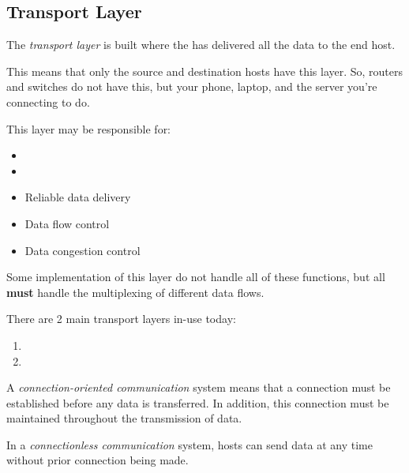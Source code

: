 \subsection{Transport Layer}\label{subsec:Transport_Layer}
\begin{definition}\label{def:Transport_Layer}
  The \emph{transport layer} is built where the  has delivered all the data to the end host.

  This means that only the source and destination hosts have this layer.
  So, routers and switches do not have this, but your phone, laptop, and the server you're connecting to do.
  
  This layer may be responsible for:
  \begin{itemize}[noitemsep]
  \item {}
  \item {}
  \item Reliable data delivery
  \item Data flow control
  \item Data congestion control
  \end{itemize}
  Some implementation of this layer do not handle all of these functions, but all \textbf{must} handle the multiplexing of different data flows.

  There are 2 main transport layers in-use today:
  \begin{enumerate}[noitemsep]
  \item {}
  \item {}
  \end{enumerate}
\end{definition}

\begin{definition}\label{def:Connection_Oriented_Communication}
  A \emph{connection-oriented communication} system means that a connection must be established before any data is transferred.
  In addition, this connection must be maintained throughout the transmission of data.

  \begin{remark}\label{rmk:Connectionless_Communication}
    In a \emph{connectionless communication} system, hosts can send data at any time without prior connection being made.
  \end{remark}
\end{definition}

